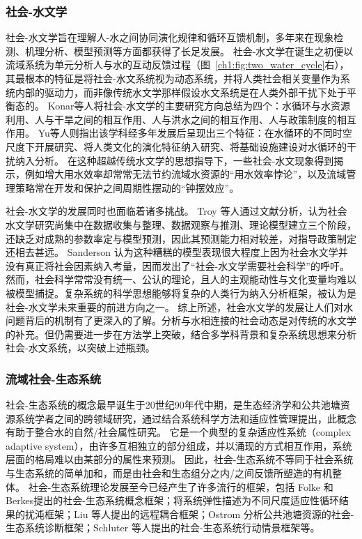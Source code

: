 \subsubsection{社会-水文学}

社会-水文学旨在理解人-水之间协同演化规律和循环互馈机制，多年来在现象检测、机理分析、模型预测等方面都获得了长足发展\cite{sivapalan2012, blair2016, srinivasan2016}。
社会-水文学在诞生之初便以流域系统为单元分析人与水的互动反馈过程（图~\ref{ch1:fig:two_water_cycle}右），其最根本的特征是将社会-水文系统视为动态系统，并将人类社会相关变量作为系统内部的驱动力，而非像传统水文学那样假设水文系统是在人类外部干扰下处于平衡态的\cite{sivapalan2012}。
Konar等人将社会-水文学的主要研究方向总结为四个：水循环与水资源利用、人与干旱之间的相互作用、人与洪水之间的相互作用、人与政策制度的相互作用\cite{konar2019}。
Yu等人则指出该学科经多年发展后呈现出三个特征：在水循环的不同时空尺度下开展研究、将人类文化的演化特征纳入研究、将基础设施建设对水循环的干扰纳入分析\cite{yu2020}。
在这种超越传统水文学的思想指导下，一些社会-水文现象得到揭示，例如增大用水效率却常常无法节约流域水资源的“用水效率悖论”\cite{grafton2018, xiong2021a}，以及流域管理策略常在开发和保护之间周期性摆动的“钟摆效应”\cite{kandasamy2014, roobavannan2017, mostert2018}。

社会-水文学的发展同时也面临着诸多挑战。
Troy 等人通过文献分析，认为社会水文学研究尚集中在数据收集与整理、数据观察与推测、理论模型建立三个阶段，还缺乏对成熟的参数率定与模型预测，因此其预测能力相对较差，对指导政策制定还相去甚远\cite{troy2015}。
Sanderson 认为这种糟糕的模型表现很大程度上因为社会水文学并没有真正将社会因素纳入考量，因而发出了“社会-水文学需要社会科学”的呼吁\cite{sanderson2017}。
然而，社会科学常常没有统一、公认的理论，且人的主观能动性与文化变量均难以被模型捕捉。复杂系统的科学思想能够将复杂的人类行为纳入分析框架，被认为是社会-水文学未来重要的前进方向之一\cite{ahlstrom2021}。
综上所述，社会水文学的发展让人们对水问题背后的机制有了更深入的了解。分析与水相连接的社会动态是对传统的水文学的补充。但仍需要进一步在方法学上突破，结合多学科背景和复杂系统思想来分析社会-水文系统，以突破上述瓶颈。


\subsubsection{流域社会-生态系统}

社会-生态系统的概念最早诞生于20世纪90年代中期，是生态经济学和公共池塘资源系统学者之间的跨领域研究，通过结合系统科学方法和适应性管理提出\cite{biggs2021}，此概念有助于整合水的自然/社会属性研究\cite{fowler2022}。
它是一个典型的复杂适应性系统（complex adaptive system），由许多互相独立的部分组成，并以涌现的方式相互作用，系统层面的格局难以由某部分的属性来预测\cite{schluter2019}。
因此，社会-生态系统不等同于社会系统与生态系统的简单加和，而是由社会和生态组分之内/之间反馈所塑造的有机整体\cite{biggs2021}。
社会-生态系统理论发展至今已经产生了许多流行的框架，包括 Folke 和 Berkes提出的社会-生态系统概念框架\cite{berkes2008}；将系统弹性描述为不同尺度适应性循环结果的扰沌框架\cite{gunderson2001}；Liu 等人提出的远程耦合框架\cite{liu2018}；Ostrom 分析公共池塘资源的社会-生态系统诊断框架\cite{ostrom2009}；Schluter 等人提出的社会-生态系统行动情景框架等\cite{schluter2019}。

